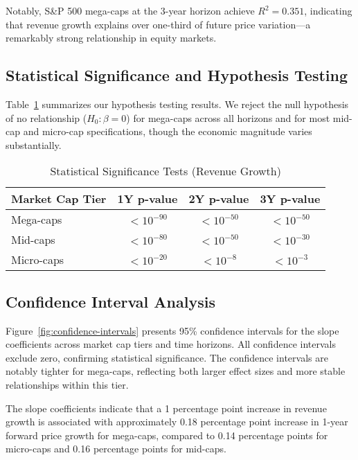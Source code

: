 \documentclass[11pt]{article}
\begin{document}
\vspace{1em}
\FloatBarrier

Notably, S\&P 500 mega-caps at the 3-year horizon achieve $R^2 = 0.351$, indicating that revenue growth explains over one-third of future price variation—a remarkably strong relationship in equity markets.

\subsection{Statistical Significance and Hypothesis Testing}

Table~\ref{tab:hypothesis-tests} summarizes our hypothesis testing results. We reject the null hypothesis of no relationship ($H_0: \beta = 0$) for mega-caps across all horizons and for most mid-cap and micro-cap specifications, though the economic magnitude varies substantially.

\begin{table}[!htbp]
\small
\centering
\caption{Statistical Significance Tests (Revenue Growth)}
\label{tab:hypothesis-tests}
\begin{tabular}{lccc}
\toprule
Market Cap Tier & 1Y p-value & 2Y p-value & 3Y p-value \\
\midrule
Mega-caps & $< 10^{-90}$ & $< 10^{-50}$ & $< 10^{-50}$ \\
Mid-caps  & $< 10^{-80}$ & $< 10^{-50}$ & $< 10^{-30}$ \\
Micro-caps & $< 10^{-20}$ & $< 10^{-8}$ & $< 10^{-3}$ \\
\bottomrule
\end{tabular}
\end{table}

\FloatBarrier

\subsection{Confidence Interval Analysis}

Figure~\ref{fig:confidence-intervals} presents 95\% confidence intervals for the slope coefficients across market cap tiers and time horizons. All confidence intervals exclude zero, confirming statistical significance. The confidence intervals are notably tighter for mega-caps, reflecting both larger effect sizes and more stable relationships within this tier.

The slope coefficients indicate that a 1 percentage point increase in revenue growth is associated with approximately 0.18 percentage point increase in 1-year forward price growth for mega-caps, compared to 0.14 percentage points for micro-caps and 0.16 percentage points for mid-caps.
\end{document}
